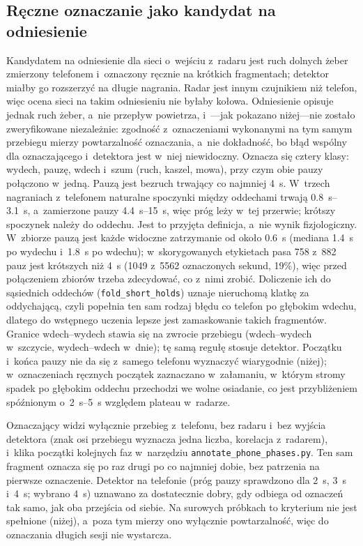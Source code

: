 \documentclass[12pt,a4paper,oneside]{report}
\begin{document}
\subsection{Ręczne oznaczanie jako kandydat na odniesienie}
\label{sec:sieci-oznaczanie-reczne}
Kandydatem na odniesienie dla sieci o~wejściu z~radaru jest ruch dolnych żeber zmierzony
telefonem i~oznaczony ręcznie na krótkich fragmentach; detektor miałby go rozszerzyć na długie
nagrania. Radar jest innym czujnikiem niż telefon, więc ocena sieci na takim odniesieniu nie
byłaby kołowa. Odniesienie opisuje jednak ruch żeber, a~nie przepływ powietrza, i~---jak pokazano
niżej---nie zostało zweryfikowane niezależnie: zgodność z~oznaczeniami wykonanymi na tym samym
przebiegu mierzy powtarzalność oznaczania, a~nie dokładność, bo błąd wspólny dla oznaczającego
i~detektora jest w~niej niewidoczny. Oznacza się cztery klasy: wydech, pauzę, wdech i~szum (ruch,
kaszel, mowa), przy czym obie pauzy połączono w~jedną. Pauzą jest bezruch trwający co najmniej
\SI{4}{s}. W~trzech nagraniach z~telefonem naturalne spoczynki między oddechami trwają
\SIrange{0.8}{3.1}{s}, a~zamierzone pauzy \SIrange{4.4}{15}{s}, więc próg leży w~tej przerwie;
krótszy spoczynek należy do oddechu. Jest to przyjęta definicja, a~nie wynik fizjologiczny.
W~zbiorze \cite{szymanski2025} pauzą jest każde widoczne zatrzymanie od około \SI{0.6}{s}
(mediana \SI{1.4}{s} po wydechu i~\SI{1.8}{s} po wdechu); w~skorygowanych etykietach pasa 758 z~882
pauz jest krótszych niż \SI{4}{s} (1049 z~5562 oznaczonych sekund, 19\%), więc przed połączeniem
zbiorów trzeba zdecydować, co z~nimi zrobić. Doliczenie ich do sąsiednich oddechów
(\texttt{fold\_short\_holds}) uznaje nieruchomą klatkę za oddychającą, czyli popełnia ten sam rodzaj
błędu co telefon po głębokim wdechu, dlatego do wstępnego uczenia lepsze jest zamaskowanie takich
fragmentów. Granice wdech--wydech stawia się na zwrocie przebiegu (wdech--wydech w~szczycie,
wydech--wdech w~dnie); tę samą regułę stosuje detektor. Początku i~końca pauzy nie da się z~samego telefonu wyznaczyć wiarygodnie
(niżej); w~oznaczeniach ręcznych początek zaznaczano w~załamaniu, w~którym stromy spadek po
głębokim oddechu przechodzi we wolne osiadanie, co jest przybliżeniem spóźnionym o~\SIrange{2}{5}{s}
względem plateau w~radarze.

Oznaczający widzi wyłącznie przebieg z~telefonu, bez radaru i~bez wyjścia detektora (znak osi
przebiegu wyznacza jedna liczba, korelacja z~radarem), i~klika początki kolejnych faz w~narzędziu
\texttt{annotate\_phone\_phases.py}. Ten sam fragment oznacza się po raz drugi po co najmniej dobie,
bez patrzenia na pierwsze oznaczenie. Detektor na telefonie (próg pauzy sprawdzono dla \SI{2}{s},
\SI{3}{s} i~\SI{4}{s}; wybrano \SI{4}{s}) uznawano za dostatecznie dobry, gdy odbiega od oznaczeń tak
samo, jak oba przejścia od siebie. Na surowych próbkach to kryterium nie jest spełnione (niżej), a~poza
tym mierzy ono wyłącznie powtarzalność, więc do oznaczania długich sesji nie wystarcza.
\end{document}
